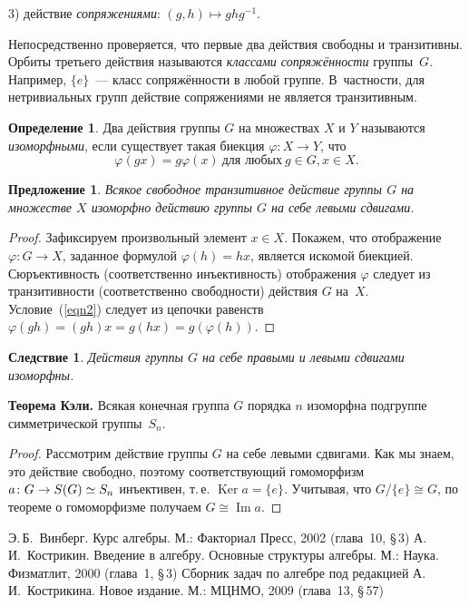 \documentclass[a4paper,10pt]{amsart}
\newcommand{\Ker}{\mathop{\mathrm{Ker}}}
\renewcommand{\Im}{\mathop{\mathrm{Im}}}
\newtheorem{proposition}{Предложение}
\newtheorem{corollary}{Следствие}
\theoremstyle{definition}
\newtheorem{definition}{Определение}
\theoremstyle{remark}
\begin{document}
3) действие {\it сопряжениями}: $(g,h)\mapsto ghg^{-1}$.

Непосредственно проверяется, что первые два действия свободны и
транзитивны. Орбиты третьего действия называются {\it классами
сопряжённости} группы~$G$. Например, $\{e\}$~--- класс сопряжённости
в любой группе. В~частности, для нетривиальных групп действие
сопряжениями не является транзитивным.

\begin{definition}
Два действия группы $G$ на множествах $X$ и $Y$ называются {\it
изоморфными}, если существует такая биекция $\varphi\colon X\to Y$,
что
\begin{equation} \label{eqn2}
\varphi(gx)=g\varphi(x) \ \text{для любых} \ g\in G, x\in X.
\end{equation}
\end{definition}

\begin{proposition}
Всякое свободное транзитивное действие группы $G$ на множестве $X$
изоморфно действию группы $G$ на себе левыми сдвигами.
\end{proposition}

\begin{proof}
Зафиксируем произвольный элемент $x\in X$. Покажем, что отображение
$\varphi \colon G\to X$, заданное формулой $\varphi(h) = hx$,
является искомой биекцией. Сюръективность (соответственно
инъективность) отображения $\varphi$ следует из транзитивности
(соответственно свободности) действия $G$ на~$X$.
Условие~(\ref{eqn2}) следует из цепочки равенств $\varphi(gh) =
(gh)x = g(hx) = g(\varphi(h))$.
\end{proof}

\begin{corollary}
Действия группы $G$ на себе правыми и левыми сдвигами изоморфны.
\end{corollary}

\smallskip

{\bf Теорема Кэли.} Всякая конечная группа $G$ порядка $n$ изоморфна
подгруппе симметрической группы~$S_n$.

\begin{proof}
Рассмотрим действие группы $G$ на себе левыми сдвигами. Как мы
знаем, это действие свободно, поэтому соответствующий гомоморфизм $a
\colon G \to S(G) \simeq\nobreak S_n$ инъективен, т.\,е. $\Ker a =
\lbrace e \rbrace$. Учитывая, что $G / \lbrace e \rbrace \cong G$,
по теореме о гомоморфизме получаем $G \cong \Im a$.
\end{proof}


\bigskip

\begin{thebibliography}{99}
Э.\,Б.~Винберг. Курс алгебры. М.: Факториал Пресс, 2002 (глава~10,
\S\,3)
А.\,И.~Кострикин. Введение в алгебру. Основные структуры алгебры.
М.: Наука. Физматлит, 2000 (глава~1, \S\,3)
Сборник задач по алгебре под редакцией А.\,И.~Кострикина. Новое
издание. М.: МЦНМО, 2009 (глава~13, \S\,57)
\end{thebibliography}
\end{document}
